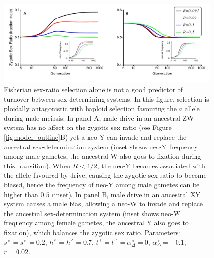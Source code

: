 \documentclass[12pt]{article}
\begin{document}
\begin{figure}[!h]
\centering
\includegraphics[width=\linewidth]{Temporal_SR}
\caption{
Fisherian sex-ratio selection alone is not a good predictor of turnover between sex-determining systems.
In this figure, selection is ploidally antagonistic with haploid selection favouring the $a$ allele during male meiosis.
In panel A, male drive in an ancestral ZW system has no affect on the zygotic sex ratio (see Figure \ref{fig:model_outline}B) yet a neo-Y can invade and replace the ancestral sex-determination system (inset shows neo-Y frequency among male gametes, the ancestral W also goes to fixation during this transition). 
When $R<1/2$, the neo-Y becomes associated with the allele favoured by drive, causing the zygotic sex ratio to become biased, hence the frequency of neo-Y among male gametes can be higher than $0.5$ (inset).
In panel B, male drive in an ancestral XY system causes a male bias, allowing a neo-W to invade and replace the ancestral sex-determination system (inset shows neo-W frequency among female gametes, the ancestral Y also goes to fixation), which balances the zygotic sex ratio.
Parameters:  $s^\female =s^\male = 0.2$, $h^\female = h^\male = 0.7$, $t^\female = t^\male = \alpha^\female_\Delta = 0$, $\alpha^\male_\Delta = -0.1$, $r=0.02$.
}
\label{fig:SexRatioBad}
\end{figure}
\end{document}

